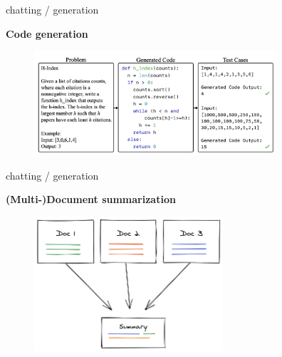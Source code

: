 
\begin{vbframe}{chatting / generation}

\vfill
	
\textbf{Code generation}

\begin{figure}
	\centering
		\includegraphics[width = 9cm]{figure/code-generation.png}\\ 
\end{figure}

\vfill

\end{vbframe}


\begin{vbframe}{chatting / generation}

\vfill
	
\textbf{(Multi-)Document summarization}

\begin{figure}
	\centering
		\includegraphics[width = 7cm]{figure/mds-diagram.png}\\ 
\end{figure}

\vfill

\end{vbframe}

